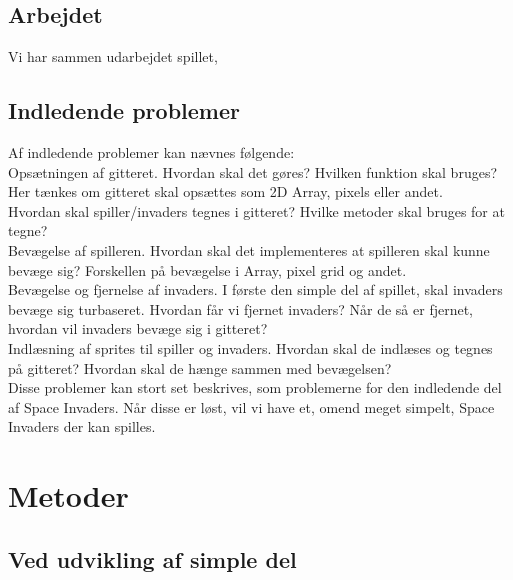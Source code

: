 \documentclass[a4paper,12pt]{article}
\begin{document}
\subsection{Arbejdet}
Vi har sammen udarbejdet spillet, 
\subsection{Indledende problemer}
Af indledende problemer kan nævnes følgende:\\

 \quad \textbullet \quad Opsætningen af gitteret. Hvordan skal det gøres? Hvilken funktion skal bruges? Her tænkes om gitteret skal opsættes som 2D Array, pixels eller andet.\\
 
 
 \quad \textbullet \quad Hvordan skal spiller/invaders tegnes i gitteret? Hvilke metoder skal bruges for at tegne?\\
 
 
 \quad \textbullet \quad Bevægelse af spilleren. Hvordan skal det implementeres at spilleren skal kunne bevæge sig? Forskellen på bevægelse i Array, pixel grid og andet.\\
 
 \quad \textbullet \quad Bevægelse og fjernelse af invaders. I første den simple del af spillet, skal invaders bevæge sig turbaseret. Hvordan får vi fjernet invaders? Når de så er fjernet, hvordan vil invaders bevæge sig i gitteret?\\
 
  \quad \textbullet \quad Indlæsning af sprites til spiller og invaders. Hvordan skal de indlæses og tegnes på gitteret? Hvordan skal de hænge sammen med bevægelsen?\\
 
Disse problemer kan stort set beskrives, som problemerne for den indledende del af Space Invaders. Når disse er løst, vil vi have et, omend meget simpelt, Space Invaders der kan spilles.
\newpage
 
\section{Metoder}
\subsection{Ved udvikling af simple del}
\end{document}
